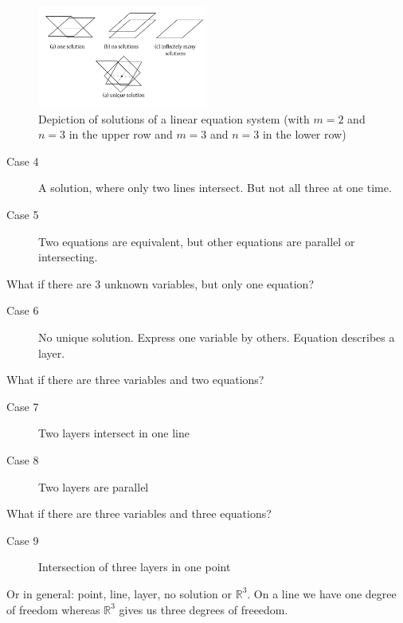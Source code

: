 \documentclass[a4paper,landscape,twocolumn]{article}
\begin{document}
\begin{figure}[t]
  \begin{center}
    \includegraphics[width=0.5\textwidth]{img/linear_equation_visualization2.pdf}
    \caption{
      Depiction of solutions of a linear equation system
      (with $m=2$ and $n=3$ in the upper row and $m=3$ and $n=3$ in the lower row)
    }
    \label{img:lineqsys-solutions2}
  \end{center}
\end{figure}

\begin{description}
  \item[Case 4]
    A solution, where only two lines intersect. But not all three at one time.
  \item[Case 5]
    Two equations are equivalent, but other equations are parallel or intersecting.
\end{description}

What if there are 3 unknown variables, but only one equation?

\begin{description}
  \item[Case 6]
    No unique solution. Express one variable by others.
    Equation describes a layer.
\end{description}

What if there are three variables and two equations?

\begin{description}
  \item[Case 7] Two layers intersect in one line
  \item[Case 8] Two layers are parallel
\end{description}

What if there are three variables and three equations?

\begin{description}
  \item[Case 9] Intersection of three layers in one point
\end{description}

Or in general: point, line, layer, no solution or $\mathbb{R}^3$.
On a line we have one degree of freedom whereas $\mathbb{R}^3$ gives us three degrees of freeedom.
\end{document}
